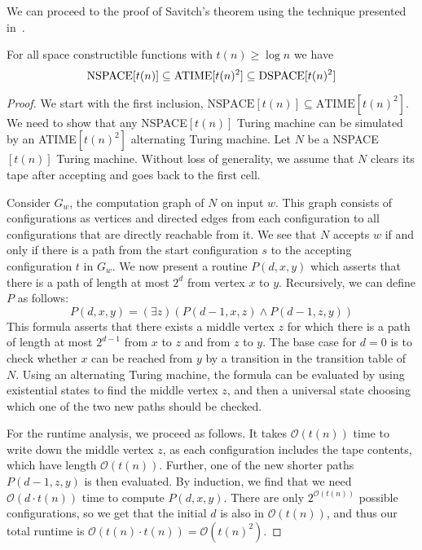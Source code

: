 We can proceed to the proof of Savitch's theorem using the technique presented in~\cite{descriptive-complexity}.
\begin{theorem}
    For all space constructible functions with $t(n) \geq \log n$ we have
    \[
        \text{\upshape NSPACE}[t(n)] \subseteq \text{\upshape ATIME}[t(n)^2] \subseteq \text{\upshape DSPACE}[t(n)^2]
    \]
\end{theorem}

\begin{proof}
    We start with the first inclusion, $\text{NSPACE$[t(n)]$} \subseteq \text{ATIME$[t(n)^2]$}$.
    We need to show that any NSPACE$[t(n)]$ Turing machine can be simulated by an ATIME$[t(n)^2]$ alternating Turing machine.
    Let $N$ be a NSPACE$[t(n)]$ Turing machine.
    Without loss of generality, we assume that $N$ clears its tape after accepting and goes back to the first cell.

    Consider $G_w$, the computation graph of $N$ on input $w$.
    This graph consists of configurations as vertices and directed edges from each configuration to all configurations that are directly reachable from it.
    We see that $N$ accepts $w$ if and only if there is a path from the start configuration $s$ to the accepting configuration $t$ in $G_w$.
    We now present a routine $P(d, x, y)$ which asserts that there is a path of length at most $2^{d}$ from vertex $x$ to $y$.
    Recursively, we can define $P$ as follows:
    \[
        P(d, x, y) = (\exists z)(P(d - 1, x, z) \land P(d - 1, z, y))
    \]
    This formula asserts that there exists a middle vertex $z$ for which there is a path of length at most $2^{d - 1}$ from $x$ to $z$ and from $z$ to $y$.
    The base case for $d = 0$ is to check whether $x$ can be reached from $y$ by a transition in the transition table of $N$.
    Using an alternating Turing machine, the formula can be evaluated by using existential states to find the middle vertex $z$, and then a universal state choosing which one of the two new paths should be checked.

    For the runtime analysis, we proceed as follows.
    It takes $\mathcal{O}(t(n))$ time to write down the middle vertex $z$, as each configuration includes the tape contents, which have length $\mathcal{O}(t(n))$.
    Further, one of the new shorter paths $P(d - 1, z, y)$ is then evaluated.
    By induction, we find that we need $\mathcal{O}(d\cdot t(n))$ time to compute $P(d, x, y)$.
    There are only $2^{\mathcal{O}(t(n))}$ possible configurations, so we get that the initial $d$ is also in $\mathcal{O}(t(n))$, and thus our total runtime is $\mathcal{O}(t(n)\cdot t(n)) = \mathcal{O}(t(n)^2)$.
    

\end{proof}
